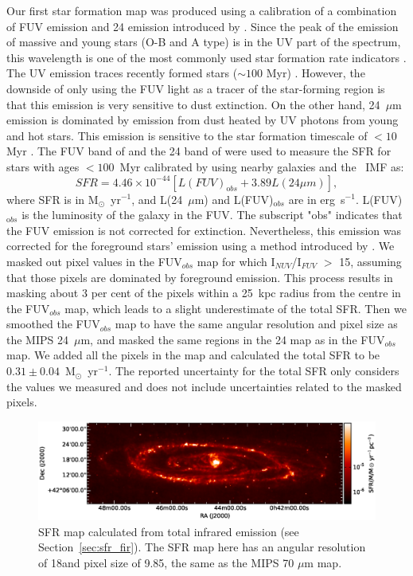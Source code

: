 Our first star formation map was produced using a calibration of a combination of FUV emission and 24 \um emission introduced by \citet{Hao11}. Since the peak of the emission of massive and young stars (O-B and A type) is in the UV part of the spectrum, this wavelength is one of the most commonly used star formation rate indicators \citep[e.g.][]{Kennicutt89}. The UV emission traces recently formed stars ($\sim 100$ Myr) \citep[e.g.][]{Kennicutt98a, Calzetti05}. However, the downside of only using the FUV light as a tracer of the star-forming region is that this emission is very sensitive to dust extinction. On the other hand, 24~$\mu$m emission is dominated by emission from dust heated by UV photons from young and hot stars. This emission is sensitive to the star formation timescale of $<10$ Myr \citep{Calzetti07}. The FUV band of \Galex and the 24 \um band of \Spitzer were used to measure the SFR for stars with ages $<100$~Myr calibrated by \citet{Hao11}  using nearby galaxies and the~\citet{Kroupa03} IMF as:
\begin{equation}
\label{equ: fuvplus24}
SFR =4.46\times10^{-44}[L(FUV)_{\mathrm obs}+3.89L(24\mu m)],
\end{equation}
\noindent where SFR is in M$_{\odot}$~yr$^{-1}$, and L(24~$\mu$m) and L(FUV)$_{\mathrm obs}$ are in erg~s$^{-1}$. L(FUV)$_{\mathrm obs}$ is the luminosity of the galaxy in the FUV. The subscript "obs" indicates that the FUV emission is not corrected for extinction. Nevertheless, this emission was corrected for the foreground stars' emission using a method introduced by \citet{Leroy08}. We masked out pixel values in the FUV$_{obs}$ map for which I$_{NUV}$/I$_{FUV}$ $>$ 15, assuming that those pixels are dominated by foreground emission. This process results in masking about 3 per cent of the pixels within a 25~kpc radius from the centre in the FUV$_{obs}$ map, which leads to a slight underestimate of the total SFR. 
Then we smoothed the FUV$_{obs}$  map to have the same angular resolution and pixel size as the MIPS 24~$\mu$m, and masked the same regions in the 24 \um map as in the FUV$_{obs}$  map. We added all the pixels in the map and calculated the total SFR to be $0.31\pm 0.04$~M$_{\odot}$~yr$^{-1}$. The reported uncertainty for the total SFR only considers the values we measured and does not include uncertainties related to the masked pixels.


\begin{figure}
    \centering
       \includegraphics[width=\textwidth]{../image_paper1/sfr_fir.eps}
    \caption[SFR map calculated from total infrared emission ]{SFR map calculated from total infrared emission (see Section~\ref{sec:sfr_fir}). The SFR map here has an angular resolution of 18\arcsec and pixel size of 9.85\arcsec, the same as the MIPS 70 $\mu$m map.}
    \label{fig:sfrs}
\end{figure}

